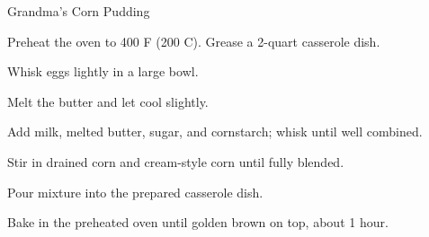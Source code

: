 \documentclass[letterpaper]{book}
\begin{document}
\begin{recipe}{Grandma's Corn Pudding}{}{}

    \newstep
    Preheat the oven to 400\0 F (200\0 C). Grease a 2-quart casserole dish.

    Whisk eggs lightly in a large bowl.

    Melt the butter and let cool slightly.

    Add milk, melted butter, sugar, and cornstarch; whisk until well combined.

    Stir in drained corn and cream-style corn until fully blended.

    \newstep
    Pour mixture into the prepared casserole dish.

    \newstep
    Bake in the preheated oven until golden brown on top, about 1 hour.
\end{recipe}
\end{document}
